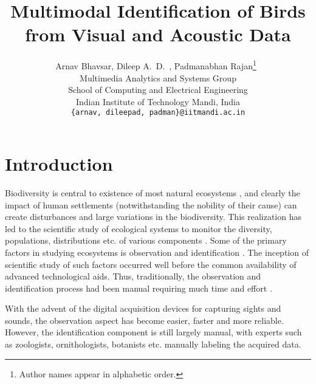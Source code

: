 \documentclass{article}
\begin{document}
\title{Multimodal Identification of Birds from Visual and Acoustic Data}
\author{Arnav Bhavsar, Dileep A.~D.~, Padmanabhan Rajan\footnote{Author names
appear in alphabetic order.}\  \\Multimedia Analytics and Systems Group \\ 
School of Computing and Electrical Engineering\\
Indian Institute of Technology Mandi, India\\
\texttt{\{arnav, dileepad, padman\}@iitmandi.ac.in}}

\date{}
\maketitle

\section{Introduction}






Biodiversity is central to existence of most natural ecosystems \cite{}, and clearly the impact of human settlements (notwithstanding the nobility of their cause) can create disturbances and large variations in the biodiversity. This realization has led to the scientific study of ecological systems to monitor the diversity, populations, distributions etc. of various components \cite{}. Some of the primary factors in studying ecosystems is observation and identification \cite{}. The inception of scientific study of such factors occurred well before the common availability of advanced technological aids. Thus, traditionally, the observation and identification process had been manual requiring much time and effort \cite{}. 

With the advent of the digital acquisition devices for capturing sights and sounds, the observation aspect has become easier, faster and more reliable. However, the identification component is still largely manual, with experts such as zoologists, ornithologists, botanists etc. manually labeling the acquired data. 
\end{document}
